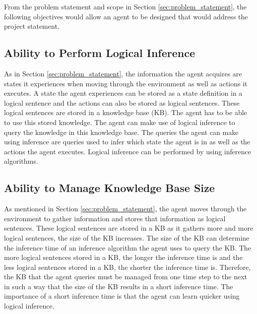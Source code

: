 From the problem statement and scope in Section \ref{sec:problem_statement}, the following objectives would allow an agent to be designed that would address the project statement.





\subsection{Ability to Perform Logical Inference}
\label{obj_1:log_inference}

As  in Section \ref{sec:problem_statement}, the information the agent acquires are states it experiences when moving through the environment as well as actions it executes. A state the agent experiences can be stored as a state definition in a logical sentence and the actions can also be stored as logical sentences. These logical sentences are stored in a knowledge base (KB). The agent has to be able to use this stored knowledge. The agent can make use of logical inference to query the knowledge in this knowledge base. The queries the agent can make using inference are queries used to infer which state the agent is in as well as the actions the agent executes. Logical inference can be performed by using inference algorithms.


\subsection{Ability to Manage Knowledge Base Size}
\label{obj_2:knowledge_base_size}

As mentioned in Section \ref{sec:problem_statement}, the agent moves through the environment to gather information and stores that information as logical sentences. These logical sentences are stored in a KB as it gathers more and more logical sentences, the size of the KB increases. The size of the KB can determine the inference time of an inference algorithm the agent uses to query the KB. The more logical sentences stored in a KB, the longer the inference time is and the less logical sentences stored in a KB, the shorter the inference time is. Therefore, the KB that the agent queries must be managed from one time step to the next in such a way that the size of the KB results in a short inference time. The importance of a short inference time is that the agent can learn quicker using logical inference. 

